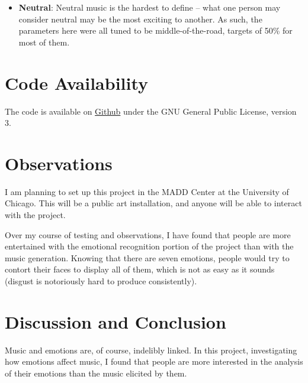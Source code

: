 \documentclass{article}
\renewcommand{\_}[1]{\underline{ #1 }}
\theoremstyle{definition}
\begin{document}
\begin{itemize}
    \item \textbf{Neutral}: Neutral music is the hardest to define -- what one person may consider neutral may be the most exciting to another. As such, the parameters here were all tuned to be middle-of-the-road, targets of 50\% for most of them. 
\end{itemize}

\section[Code Availability]{Code Availability}

The code is available on \href{https://github.com/as4mo3/face-the-music/}{Github} under the GNU General Public License, version 3. 

\section[Observations]{Observations}
\label{Observations}

I am planning to set up this project in the MADD Center at the University of Chicago. This will be a public art installation, and anyone will be able to interact with the project. 

Over my course of testing and observations, I have found that people are more entertained with the emotional recognition portion of the project than with the music generation. Knowing that there are seven emotions, people would try to contort their faces to display all of them, which is not as easy as it sounds (disgust is notoriously hard to produce consistently). 

\section[Discussion and Conclusion]{Discussion and Conclusion}
\label{Discussion and Conclusion}

Music and emotions are, of course, indelibly linked. In this project, investigating how emotions affect music, I found that people are more interested in the analysis of their emotions than the music elicited by them.


\end{document}
